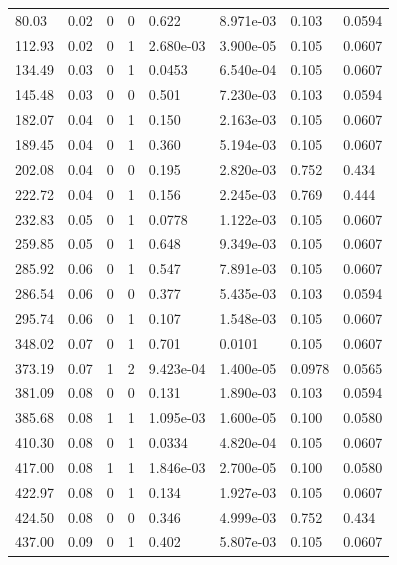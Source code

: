\documentclass[preview]{standalone}
\begin{document}
{{\begin{tabular}{L{1.2cm}C{1.2cm} C{0.3cm}C{0.5cm} C{1.4cm}C{1.4cm} C{1.4cm}C{1.4cm}}
  80.03  &  0.02  & 0     &  0 &  0.622  & 8.971e-03  & 0.103 &  0.0594   \\ 
  112.93  &  0.02  & 0     &  1 &  2.680e-03  & 3.900e-05  & 0.105 &  0.0607   \\ 
  134.49  &  0.03  & 0     &  1 &  0.0453  & 6.540e-04  & 0.105 &  0.0607   \\ 
  145.48  &  0.03  & 0     &  0 &  0.501  & 7.230e-03  & 0.103 &  0.0594   \\ 
  182.07  &  0.04  & 0     &  1 &  0.150  & 2.163e-03  & 0.105 &  0.0607   \\ 
  189.45  &  0.04  & 0     &  1 &  0.360  & 5.194e-03  & 0.105 &  0.0607   \\ 
  202.08  &  0.04  & 0     &  0 &  0.195  & 2.820e-03  & 0.752 &  0.434   \\ 
  222.72  &  0.04  & 0     &  1 &  0.156  & 2.245e-03  & 0.769 &  0.444   \\ 
  232.83  &  0.05  & 0     &  1 &  0.0778  & 1.122e-03  & 0.105 &  0.0607   \\ 
  259.85  &  0.05  & 0     &  1 &  0.648  & 9.349e-03  & 0.105 &  0.0607   \\ 
  285.92  &  0.06  & 0     &  1 &  0.547  & 7.891e-03  & 0.105 &  0.0607   \\ 
  286.54  &  0.06  & 0     &  0 &  0.377  & 5.435e-03  & 0.103 &  0.0594   \\ 
  295.74  &  0.06  & 0     &  1 &  0.107  & 1.548e-03  & 0.105 &  0.0607   \\ 
  348.02  &  0.07  & 0     &  1 &  0.701  & 0.0101  & 0.105 &  0.0607   \\ 
  373.19  &  0.07  & 1     &  2 &  9.423e-04  & 1.400e-05  & 0.0978 &  0.0565   \\ 
  381.09  &  0.08  & 0     &  0 &  0.131  & 1.890e-03  & 0.103 &  0.0594   \\ 
  385.68  &  0.08  & 1     &  1 &  1.095e-03  & 1.600e-05  & 0.100 &  0.0580   \\ 
  410.30  &  0.08  & 0     &  1 &  0.0334  & 4.820e-04  & 0.105 &  0.0607   \\ 
  417.00  &  0.08  & 1     &  1 &  1.846e-03  & 2.700e-05  & 0.100 &  0.0580   \\ 
  422.97  &  0.08  & 0     &  1 &  0.134  & 1.927e-03  & 0.105 &  0.0607   \\ 
  424.50  &  0.08  & 0     &  0 &  0.346  & 4.999e-03  & 0.752 &  0.434   \\ 
  437.00  &  0.09  & 0     &  1 &  0.402  & 5.807e-03  & 0.105 &  0.0607   \\ 

\end{tabular}}}
\end{document}
